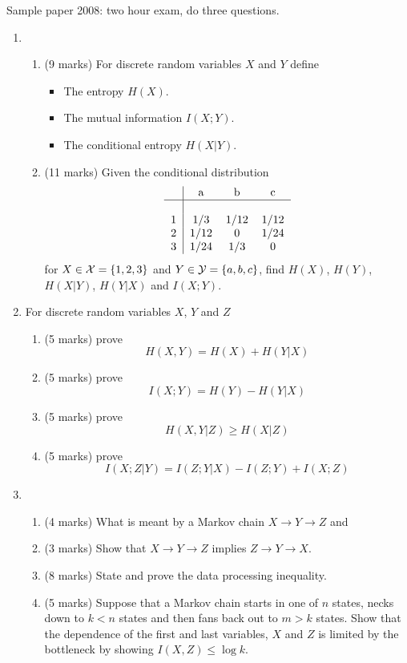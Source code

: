 \documentclass[12pt]{article}
\begin{document}
Sample paper 2008: two hour exam, do three questions.

\begin{enumerate}
\item %
\begin{enumerate}
\item (9 marks) For discrete random variables $X$ and $Y$ define
\begin{itemize}
\item The entropy $H(X)$.
\item The mutual information $I(X;Y)$.
\item The conditional entropy $H(X|Y)$.
\end{itemize}
\item (11 marks) Given the conditional distribution
$$
\begin{tabular}{c|ccc}
&a&b&c\\
\hline\\
1&1/3&1/12&1/12\\
2&1/12&0&1/24\\
3&1/24&1/3&0
\end{tabular}
$$ for $X\in{\cal X}=\{1,2,3\}$ and $Y\in{\cal Y}=\{a,b,c\}$, find
$H(X)$, $H(Y)$, $H(X|Y)$, $H(Y|X)$ and $I(X;Y)$.

\end{enumerate}

\item %
For discrete random variables $X$, $Y$ and $Z$
\begin{enumerate} 
\item (5 marks) prove
$$H(X,Y)=H(X)+H(Y|X)$$
\item (5 marks) prove
$$I(X;Y)=H(Y)-H(Y|X)$$
\item (5 marks) prove
$$H(X,Y|Z)\ge H(X|Z)$$
\item (5 marks) prove
$$I(X;Z|Y)=I(Z;Y|X)-I(Z;Y)+I(X;Z)$$ 
\end{enumerate}


\item %
\begin{enumerate}
\item (4 marks) What is meant by a Markov chain $X\rightarrow
  Y\rightarrow Z$ and 
\item (3 marks) Show that $X\rightarrow Y\rightarrow Z$ implies
  $Z\rightarrow Y\rightarrow X$.
\item (8 marks) State and prove the data processing inequality.
\item (5 marks) Suppose that a Markov chain starts in one of $n$ states, necks down to $k<n$ states and then fans back out to $m>k$ states. Show that the dependence of the first and last variables, $X$ and $Z$ is limited by the bottleneck by showing $I(X,Z)\le\log{k}$.
\end{enumerate}



\end{enumerate}
\end{document}
